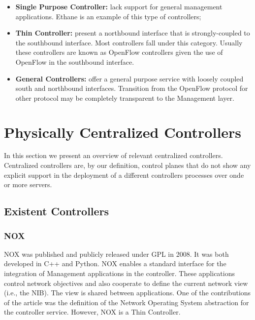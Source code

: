 \begin{itemize}
\item[] \textbf{Single Purpose Controller:} lack support for general management
  applications. Ethane is an example of this type of controllers; 
\item[] \textbf{Thin Controller:} present a northbound interface that is
  strongly-coupled to the southbound interface. Most controllers fall
  under this category. Usually these controllers are known as OpenFlow controllers given the use of OpenFlow in the southbound interface.  
\item[] \textbf{General Controllers:} offer a general purpose service with loosely
  coupled south and northbound interfaces. Transition from the OpenFlow protocol for
  other protocol may  be completely transparent to the Management layer.
\end{itemize}



\section{Physically Centralized  Controllers}
\glsresetall
\label{sec:background:centralized}


In this section we present an overview of relevant centralized
controllers. Centralized controllers are, by our definition, control
planes that do not show any explicit support in the deployment of a
different controllers processes over onde or more servers. 
\subsection{Existent Controllers}
\subsubsection{NOX}
\label{sec:nox}
NOX \cite{Gude:2008jd}  was published and publicly released under
GPL in 2008. It was both developed in C++ and Python. NOX enables a standard interface for the integration of  Management applications 
in the controller. These applications control
network objectives and also cooperate to define the current
network view (i.e., the NIB). The view is shared between applications. One of the
contributions of the article was the definition of the Network
Operating System abstraction for the controller service. However, NOX
is a Thin Controller. 

